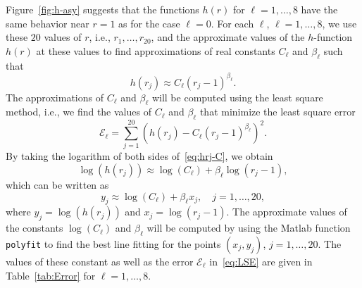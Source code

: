Figure~\ref{fig:h-asy} suggests that the functions $h(r)$ for $\ell=1,\ldots,8$ have the same behavior near $r=1$ as for the case $\ell=0$. 
For each $\ell$, $\ell=1,\ldots,8$, we use these $20$ values of $r$, i.e., $r_1,\ldots,r_{20}$, and the approximate values of the $h$-function $h(r)$ at these values to find approximations of real constants $C_\ell$ and $\beta_\ell$ such that
\begin{equation}\label{eq:hrj-C}
h(r_j)\approx C_\ell (r_j-1)^{\beta_\ell}.
\end{equation}
The approximations of $C_\ell$ and $\beta_\ell$ will be computed using the least square method, i.e., we find the values of $C_\ell$ and $\beta_\ell$ that minimize the least square error 
\begin{equation}\label{eq:LSE}
\mathcal{E}_\ell = \sum_{j=1}^{20}\left(h(r_j)-C_\ell(r_j-1)^{\beta_\ell}\right)^2.
\end{equation}
By taking the logarithm of both sides of~\eqref{eq:hrj-C}, we obtain
\[
\log(h(r_j))\approx \log(C_\ell)+\beta_\ell\log(r_j-1),
\]
which can be written as 
\[
y_j\approx\log(C_\ell)+\beta_\ell x_j, \quad j=1,\ldots,20,
\]
where $y_j= \log(h(r_j))$ and $x_j=\log(r_j-1)$. The approximate values of the constants $\log(C_\ell)$ and $\beta_\ell$ will be computed by using the {\sc Matlab} function \verb|polyfit| to find the best line fitting for the points $(x_j,y_j)$, $j=1,\ldots,20$. The values of these constant as well as the error $\mathcal{E}_\ell$ in~\eqref{eq:LSE} are given in Table~\ref{tab:Error} for $\ell=1,\ldots,8$.

